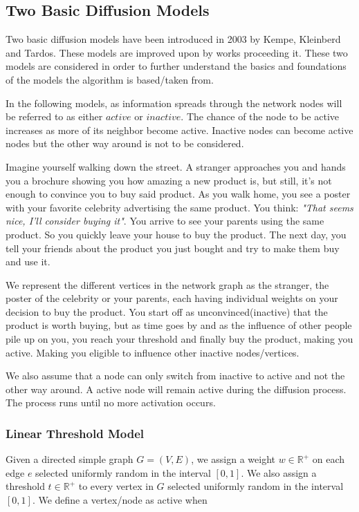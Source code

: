\subsection{Two Basic Diffusion Models}
Two basic diffusion models have been introduced in 2003 by Kempe, Kleinberd and Tardos.\cite{Kempe} These models are improved upon by works proceeding it. These two models are considered in order to further understand the basics and foundations of the models the algorithm is based/taken from.


In the following models, as information spreads through the network nodes will be referred to as either $active$ or $inactive$. The chance of the node to be active increases as more of its neighbor become active. Inactive nodes can become active nodes but the other way around is not to be considered. 

Imagine yourself walking down the street. A stranger approaches you and hands you a brochure showing you how amazing a new product is, but still, it's not enough to convince you to buy said product. As you walk home, you see a poster with your favorite celebrity advertising the same product. You think: \textit{"That seems nice, I'll consider buying it"}. You arrive to see your parents using the same product. So you quickly leave your house to buy the product. The next day, you tell your friends about the product you just bought and try to make them buy and use it.

We represent the different vertices in the network graph as the stranger, the poster of the celebrity or your parents, each having individual weights on your decision to buy the product. You start off as unconvinced(inactive) that the product is worth buying, but as time goes by and as the influence of other people pile up on you, you reach your threshold and finally buy the product, making you active. Making you eligible to influence other inactive nodes/vertices.

We also assume that a node can only switch from inactive to active and not the other way around. A active node will remain active during the diffusion process. The process runs until no more activation occurs.\cite{Shakarian:2012:LSN:2456719.2457081}
\subsubsection{Linear Threshold Model}
Given a directed simple graph $G=(V,E)$, we assign a weight $w\in \mathbb{R}^{+}$ on each edge $e$ selected uniformly random in the interval $[0,1]$. We also assign a threshold $t \in \mathbb{R}^{+}$ to every vertex in $G$ selected uniformly random in the interval $[0,1]$.
We define a vertex/node as active when

